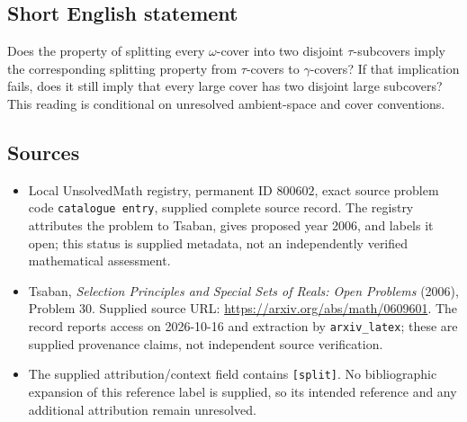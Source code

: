 \documentclass[11pt]{article}
\begin{document}
\subsection{Short English statement}
Does the property of splitting every \(\omega\)-cover into two disjoint \(\tau\)-subcovers imply the corresponding splitting property from \(\tau\)-covers to \(\gamma\)-covers? If that implication fails, does it still imply that every large cover has two disjoint large subcovers? This reading is conditional on unresolved ambient-space and cover conventions.
\subsection{Sources}
\begin{itemize}
\item Local UnsolvedMath registry, permanent ID \(800602\), exact source problem code \texttt{catalogue entry}, supplied complete source record. The registry attributes the problem to Tsaban, gives proposed year 2006, and labels it open; this status is supplied metadata, not an independently verified mathematical assessment.
\item Tsaban, \emph{Selection Principles and Special Sets of Reals: Open Problems} (2006), Problem 30. Supplied source URL: \url{https://arxiv.org/abs/math/0609601}. The record reports access on 2026-10-16 and extraction by \texttt{arxiv\_latex}; these are supplied provenance claims, not independent source verification.
\item The supplied attribution/context field contains \texttt{[split]}. No bibliographic expansion of this reference label is supplied, so its intended reference and any additional attribution remain unresolved.
\end{itemize}
\end{document}
